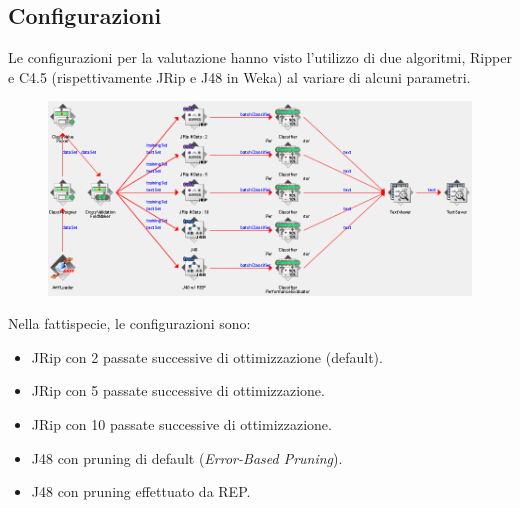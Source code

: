 \subsection{Configurazioni}
Le configurazioni per la valutazione hanno visto l'utilizzo di due algoritmi, Ripper e C4.5 (rispettivamente JRip e J48 in Weka) al variare di alcuni parametri.

\begin{figure}[!htbp]
	\hspace*{-1.1in}
	\includegraphics[width=1.4\textwidth]{./images/flow3}
\end{figure}

Nella fattispecie, le configurazioni sono:
\begin{itemize}
	\item JRip con 2 passate successive di ottimizzazione (default).
	\item JRip con 5 passate successive di ottimizzazione.
	\item JRip con 10 passate successive di ottimizzazione.
	\item J48 con pruning di default (\textit{Error-Based Pruning})\cite{Quinlan:1993:CPM:152181}.
	\item J48 con pruning effettuato da REP.
\end{itemize}
%
%
%
%

